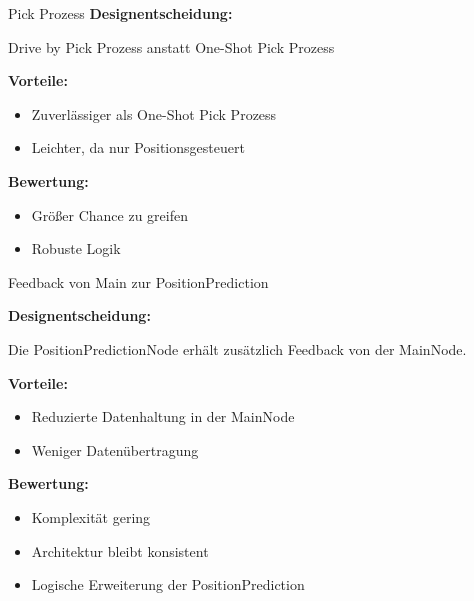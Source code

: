 \documentclass[aspectratio=169]{beamer}
\begin{document}
	\begin{frame}{Pick Prozess}
		\textbf{Designentscheidung:}
		
		Drive by Pick Prozess anstatt One-Shot Pick Prozess
		\vspace{0.5em}

		\textbf{Vorteile:}
		\begin{itemize}
			\item Zuverlässiger als One-Shot Pick Prozess
			\item Leichter, da nur Positionsgesteuert
		\end{itemize}
		\textbf{Bewertung:}
		\begin{itemize}
			\item Größer Chance zu greifen
			\item Robuste Logik
		\end{itemize}
		
	\end{frame}
	
	\begin{frame}{Feedback von Main zur PositionPrediction} %

		\textbf{Designentscheidung:}

		Die PositionPredictionNode erhält zusätzlich Feedback von der MainNode.

		\vspace{0.5em}

		\textbf{Vorteile:}
		\begin{itemize}
			\item Reduzierte Datenhaltung in der MainNode
			\item Weniger Datenübertragung 
		\end{itemize}

		\vspace{0.5em}

		\textbf{Bewertung:}
		\begin{itemize}
			\item Komplexität gering
			\item Architektur bleibt konsistent
			\item Logische Erweiterung der PositionPrediction
		\end{itemize}

		\vfill

	\end{frame}
\end{document}
